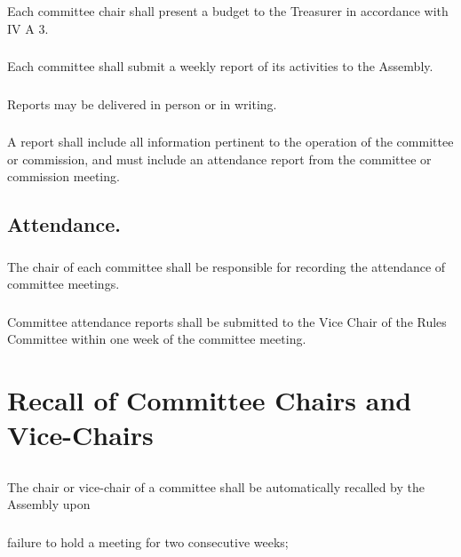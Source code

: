 \documentclass{rules}
\begin{document}
\subsubsection{}
Each committee chair shall present a budget to the Treasurer in accordance with IV A 3.
\subsubsection{}
Each committee shall submit a weekly report of its activities to the Assembly. 
\subsubsection{}
Reports may be delivered in person or in writing.
\subsubsection{}
A report shall include all information pertinent to the operation of the committee or commission, and must include an attendance report from the committee or commission meeting.
\subsection{Attendance.}
\subsubsection{}
The chair of each committee shall be responsible for recording the attendance of committee meetings. 
\subsubsection{}
Committee attendance reports shall be submitted to the Vice Chair of the Rules Committee within one week of the committee meeting.

\section{Recall of Committee Chairs and Vice-Chairs}
\subsection{}
The chair or vice-chair of a committee shall be automatically recalled by the Assembly upon
\subsubsection{}
failure to hold a meeting for two consecutive weeks;
\end{document}
